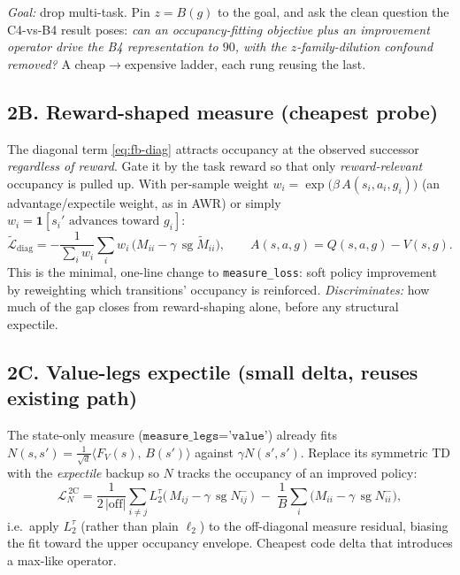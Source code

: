 \documentclass[11pt]{article}
\newcommand{\sg}{\operatorname{sg}}                 %
\newcommand{\Ind}{\mathbf{1}}
\newcommand{\inner}[2]{\langle #1,\, #2\rangle}
\newcommand{\Fmap}{F}                                %
\newcommand{\Bmap}{B}                                %
\newcommand{\Lexp}{L^{\tau}_2}                       %
\begin{document}
\emph{Goal:} drop multi-task. Pin $z=\Bmap(g)$ to the goal, and ask the clean
question the C4-vs-B4 result poses: \emph{can an occupancy-fitting objective plus
an improvement operator drive the B4 representation to $90$, with the
$z$-family-dilution confound removed?} A cheap$\to$expensive ladder, each rung
reusing the last.

\subsection*{2B. Reward-shaped measure (cheapest probe)}
The diagonal term \eqref{eq:fb-diag} attracts occupancy at the observed
successor \emph{regardless of reward}. Gate it by the task reward so that only
\emph{reward-relevant} occupancy is pulled up. With per-sample weight
$w_i=\exp\!\big(\beta\,A(s_i,a_i,g_i)\big)$ (an advantage/expectile weight, as in
AWR) or simply $w_i=\Ind[\text{$s_i'$ advances toward $g_i$}]$:
\begin{equation}
  \tilde{\mathcal{L}}_{\mathrm{diag}}
    = -\frac{1}{\sum_i w_i}\sum_{i} w_i\,\big(M_{ii}-\gamma\,\sg\tilde M_{ii}\big),
  \qquad A(s,a,g)=Q(s,a,g)-V(s,g).
  \label{eq:rew-shaped}
\end{equation}
This is the minimal, one-line change to \texttt{measure\_loss}: soft policy
improvement by reweighting which transitions' occupancy is reinforced.
\emph{Discriminates:} how much of the gap closes from reward-shaping alone,
before any structural expectile.

\subsection*{2C. Value-legs expectile (small delta, reuses existing path)}
The state-only measure ($\texttt{measure\_legs='value'}$) already fits
$N(s,s')=\tfrac1{\sqrt d}\inner{\Fmap_V(s)}{\Bmap(s')}$ against
$\gamma N(s',s')$. Replace its symmetric TD with the \emph{expectile} backup so
$N$ tracks the occupancy of an improved policy:
\begin{equation}
  \mathcal{L}_{N}^{\,\mathrm{2C}}
    = \frac{1}{2\,|\mathrm{off}|}\sum_{i\ne j}
      \Lexp\!\big(\,M_{ij}-\gamma\,\sg N^{-}_{ij}\,\big)
    \;-\;\frac1B\sum_i\big(M_{ii}-\gamma\,\sg N^{-}_{ii}\big),
  \label{eq:vleg-expectile}
\end{equation}
i.e.\ apply $\Lexp$ (rather than plain $\ell_2$) to the off-diagonal measure
residual, biasing the fit toward the upper occupancy envelope. Cheapest code
delta that introduces a max-like operator.
\end{document}
